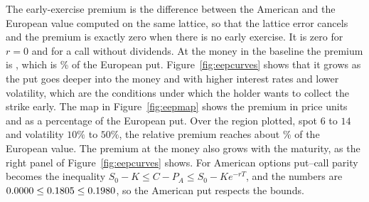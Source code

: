 The early-exercise premium is the difference between the American and the European value computed on the same lattice, so that the lattice error cancels and the premium is exactly zero when there is no early exercise.
It is zero for $r=0$ and for a call without dividends.
At the money in the baseline the premium is \EEPatm, which is \EEPatmPct\% of the European put.
Figure~\ref{fig:eepcurves} shows that it grows as the put goes deeper into the money and with higher interest rates and lower volatility, which are the conditions under which the holder wants to collect the strike early.
The map in Figure~\ref{fig:eepmap} shows the premium in price units and as a percentage of the European put.
Over the region plotted, spot $6$ to $14$ and volatility $10\%$ to $50\%$, the relative premium reaches about \EEPmaxPct\% of the European value.
The premium at the money also grows with the maturity, as the right panel of Figure~\ref{fig:eepcurves} shows.
For American options put--call parity becomes the inequality $S_0-K\le C-P_A\le S_0-Ke^{-rT}$, and the numbers are $0.0000\le0.1805\le0.1980$, so the American put respects the bounds.
